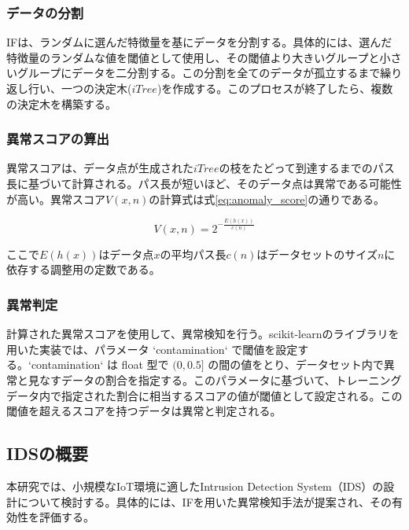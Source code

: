 \documentclass{css}
\begin{document}
\subsubsection{データの分割}

IFは、ランダムに選んだ特徴量を基にデータを分割する。具体的には、選んだ特徴量のランダムな値を閾値として使用し、その閾値より大きいグループと小さいグループにデータを二分割する。この分割を全てのデータが孤立するまで繰り返し行い、一つの決定木($iTree$)を作成する。このプロセスが終了したら、複数の決定木を構築する。

\subsubsection{異常スコアの算出}

異常スコアは、データ点が生成された$iTree$の枝をたどって到達するまでのパス長に基づいて計算される。パス長が短いほど、そのデータ点は異常である可能性が高い。異常スコア$V(x,n)$の計算式は式\ref{eq:anomaly_score}の通りである。


\begin{equation}
    V(x, n) = 2^{-\frac{E(h(x))}{c(n)}}
    \label{eq:anomaly_score}
\end{equation}


ここで$E(h(x))$はデータ点$x$の平均パス長$c(n)$はデータセットのサイズ$n$に依存する調整用の定数である。

\subsubsection{異常判定}
計算された異常スコアを使用して、異常検知を行う。scikit-learnのライブラリを用いた実装では、パラメータ `contamination` で閾値を設定する。`contamination` は float 型で $(0, 0.5]$ の間の値をとり、データセット内で異常と見なすデータの割合を指定する。このパラメータに基づいて、トレーニングデータ内で指定された割合に相当するスコアの値が閾値として設定される。この閾値を超えるスコアを持つデータは異常と判定される。



\subsection{IDSの概要}
本研究では、小規模なIoT環境に適したIntrusion Detection System（IDS）の設計について検討する。具体的には、IFを用いた異常検知手法が提案され、その有効性を評価する。
\end{document}

